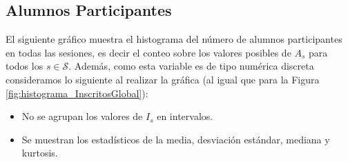 \documentclass[11pt,a4paper]{book}
\theoremstyle{definition}%
\begin{document}
                \subsection{Alumnos Participantes}
                    El siguiente gráfico muestra el histograma del número de alumnos participantes en todas las sesiones, es decir el conteo sobre los valores posibles de $A_s$ para todos los $s\in\mathcal{S}$. Además, como esta variable es de tipo numérica discreta consideramos lo siguiente al realizar la gráfica (al igual que para la Figura \ref{fig:histograma_InscritosGlobal}):
                    \begin{itemize}
                        \item No se agrupan los valores de $I_s$ en intervalos.
                        \item Se muestran los estadísticos de la media, desviación estándar, mediana y kurtosis.
                    \end{itemize}
                    
\end{document}
